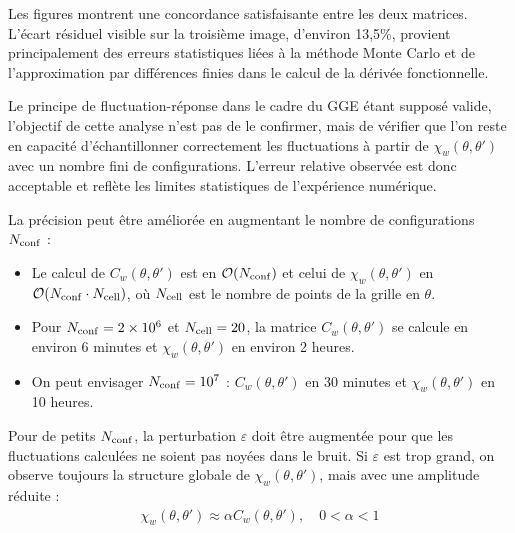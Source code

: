 Les figures montrent une concordance satisfaisante entre les deux matrices. L’écart résiduel visible sur la troisième image, d’environ 13,5\%, provient principalement des erreurs statistiques liées à la méthode Monte Carlo et de l’approximation par différences finies dans le calcul de la dérivée fonctionnelle.  

\medskip

Le principe de fluctuation-réponse dans le cadre du GGE étant supposé valide, l’objectif de cette analyse n’est pas de le confirmer, mais de vérifier que l’on reste en capacité d’échantillonner correctement les fluctuations à partir de \(\chi_w(\theta,\theta')\) avec un nombre fini de configurations. L’erreur relative observée est donc acceptable et reflète les limites statistiques de l’expérience numérique.  

\medskip

La précision peut être améliorée en augmentant le nombre de configurations \(N_{\rm conf}\) : 

\begin{itemize}[label = $\bullet$]
	\item Le calcul de \(C_w(\theta, \theta')\) est en \(\mathcal{O}(N_{\rm conf})\) et celui de \(\chi_w(\theta, \theta')\) en \(\mathcal{O}(N_{\rm conf} \cdot N_{\rm cell})\), où \(N_{\rm cell}\) est le nombre de points de la grille en \(\theta\).
	\item Pour \(N_{\rm conf} = 2\times 10^6\) et \(N_{\rm cell} = 20\), la matrice \(C_w(\theta, \theta')\) se calcule en environ 6 minutes et \(\chi_w(\theta, \theta')\) en environ 2 heures. 
	\item On peut envisager \(N_{\rm conf} = 10^7\) : \(C_w(\theta, \theta')\) en 30 minutes et \(\chi_w(\theta, \theta')\) en 10 heures.
\end{itemize} 

\medskip

Pour de petits \(N_{\rm conf}\), la perturbation \(\varepsilon\) doit être augmentée pour que les fluctuations calculées ne soient pas noyées dans le bruit. Si \(\varepsilon\) est trop grand, on observe toujours la structure globale de \(\chi_w(\theta, \theta')\), mais avec une amplitude réduite :  
\begin{eqnarray*}
	\chi_w(\theta, \theta') \approx \alpha C_w(\theta, \theta'), \quad 0 < \alpha < 1
\end{eqnarray*}

